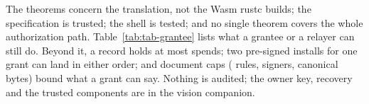 The theorems concern the translation, not the Wasm rustc builds; the
specification is trusted; the shell is tested; and no single theorem covers the
whole authorization path. Table~\ref{tab:tab-grantee} lists what a grantee or a
relayer can still do. Beyond it, a record holds at most
 spends; two pre-signed installs for one grant
can land in either order; and document caps ( rules,
 signers,  canonical bytes)
bound what a grant can say. Nothing is audited; the owner key, recovery and the
trusted components are in the vision companion.
